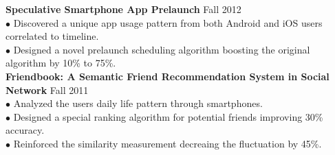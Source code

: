 \documentclass[margin, centered]{resume}
\begin{document}
\begin{resume}
	\textbf{Speculative Smartphone App Prelaunch} \hfill Fall 2012\\
	$\bullet$ Discovered a unique app usage pattern from both Android and iOS users correlated to timeline.\vspace{0mm}\\%
	$\bullet$ Designed a novel prelaunch scheduling algorithm boosting the original algorithm by 10\% to 75\%.\vspace{3mm}\\%
	\textbf{Friendbook: A Semantic Friend Recommendation System in Social Network} \hfill Fall 2011\\
	$\bullet$ Analyzed the users daily life pattern through smartphones.  \vspace{0mm}\\%
	$\bullet$ Designed a special ranking algorithm for potential friends improving 30\% accuracy. \vspace{0mm}\\%
	$\bullet$ Reinforced the similarity measurement decreaing the fluctuation by 45\%.\vspace{-2mm}\\





\end{resume}
\end{document}
